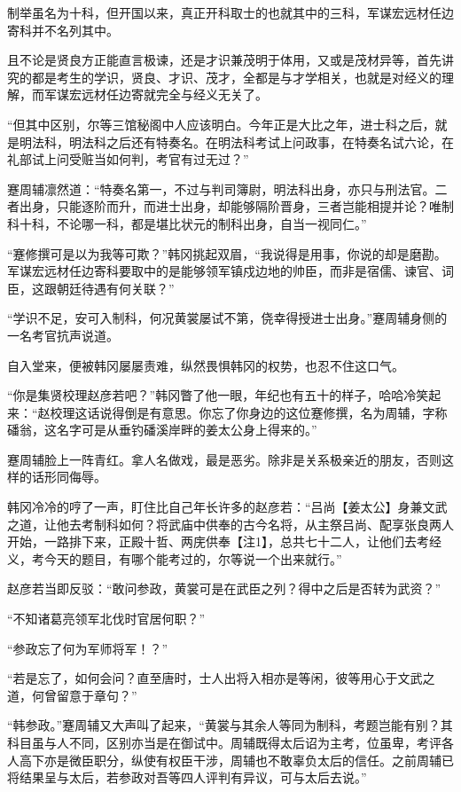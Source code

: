 制举虽名为十科，但开国以来，真正开科取士的也就其中的三科，军谋宏远材任边寄科并不名列其中。

且不论是贤良方正能直言极谏，还是才识兼茂明于体用，又或是茂材异等，首先讲究的都是考生的学识，贤良、才识、茂才，全都是与才学相关，也就是对经义的理解，而军谋宏远材任边寄就完全与经义无关了。

“但其中区别，尔等三馆秘阁中人应该明白。今年正是大比之年，进士科之后，就是明法科，明法科之后还有特奏名。在明法科考试上问政事，在特奏名试六论，在礼部试上问受赃当如何判，考官有过无过？”

蹇周辅凛然道：“特奏名第一，不过与判司簿尉，明法科出身，亦只与刑法官。二者出身，只能逐阶而升，而进士出身，却能够隔阶晋身，三者岂能相提并论？唯制科十科，不论哪一科，都是堪比状元的制科出身，自当一视同仁。”

“蹇修撰可是以为我等可欺？”韩冈挑起双眉，“我说得是用事，你说的却是磨勘。军谋宏远材任边寄科要取中的是能够领军镇戍边地的帅臣，而非是宿儒、谏官、词臣，这跟朝廷待遇有何关联？”

“学识不足，安可入制科，何况黄裳屡试不第，侥幸得授进士出身。”蹇周辅身侧的一名考官抗声说道。

自入堂来，便被韩冈屡屡责难，纵然畏惧韩冈的权势，也忍不住这口气。

“你是集贤校理赵彦若吧？”韩冈瞥了他一眼，年纪也有五十的样子，哈哈冷笑起来：“赵校理这话说得倒是有意思。你忘了你身边的这位蹇修撰，名为周辅，字称磻翁，这名字可是从垂钓磻溪岸畔的姜太公身上得来的。”

蹇周辅脸上一阵青红。拿人名做戏，最是恶劣。除非是关系极亲近的朋友，否则这样的话形同侮辱。

韩冈冷冷的哼了一声，盯住比自己年长许多的赵彦若：“吕尚【姜太公】身兼文武之道，让他去考制科如何？将武庙中供奉的古今名将，从主祭吕尚、配享张良两人开始，一路排下来，正殿十哲、两庑供奉【注1】，总共七十二人，让他们去考经义，考今天的题目，有哪个能考过的，尔等说一个出来就行。”

赵彦若当即反驳：“敢问参政，黄裳可是在武臣之列？得中之后是否转为武资？”

“不知诸葛亮领军北伐时官居何职？”

“参政忘了何为军师将军！？”

“若是忘了，如何会问？直至唐时，士人出将入相亦是等闲，彼等用心于文武之道，何曾留意于章句？”

“韩参政。”蹇周辅又大声叫了起来，“黄裳与其余人等同为制科，考题岂能有别？其科目虽与人不同，区别亦当是在御试中。周辅既得太后诏为主考，位虽卑，考评各人高下亦是微臣职分，纵使有权臣干涉，周辅也不敢辜负太后的信任。之前周辅已将结果呈与太后，若参政对吾等四人评判有异议，可与太后去说。”

